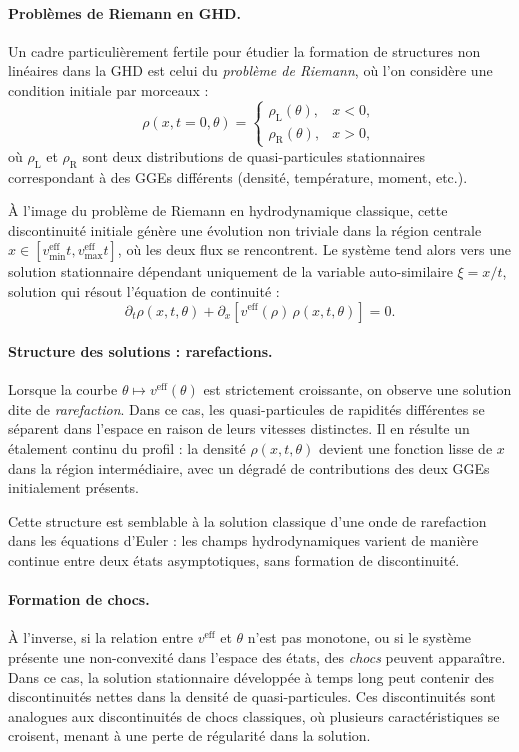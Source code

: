 \paragraph{Problèmes de Riemann en GHD.}
Un cadre particulièrement fertile pour étudier la formation de structures non linéaires dans la GHD est celui du \emph{problème de Riemann}, où l’on considère une condition initiale par morceaux :
\[
\rho(x, t = 0, \theta) =
\begin{cases}
\rho_{\mathrm{L}}(\theta), & x < 0, \\
\rho_{\mathrm{R}}(\theta), & x > 0,
\end{cases}
\]
où $\rho_{\mathrm{L}}$ et $\rho_{\mathrm{R}}$ sont deux distributions de quasi-particules stationnaires correspondant à des GGEs différents (densité, température, moment, etc.).

À l’image du problème de Riemann en hydrodynamique classique, cette discontinuité initiale génère une évolution non triviale dans la région centrale $x \in [v^{\mathrm{eff}}_{\min} t, v^{\mathrm{eff}}_{\max} t]$, où les deux flux se rencontrent. Le système tend alors vers une solution stationnaire dépendant uniquement de la variable auto-similaire $\xi = x/t$, solution qui résout l’équation de continuité :
\[
\partial_t \rho(x,t,\theta) + \partial_x \left[ v^{\mathrm{eff}}(\rho)\, \rho(x,t,\theta) \right] = 0.
\]

\paragraph{Structure des solutions : rarefactions.}
Lorsque la courbe $\theta \mapsto v^{\mathrm{eff}}(\theta)$ est strictement croissante, on observe une solution dite de \emph{rarefaction}. Dans ce cas, les quasi-particules de rapidités différentes se séparent dans l’espace en raison de leurs vitesses distinctes. Il en résulte un étalement continu du profil : la densité $\rho(x,t,\theta)$ devient une fonction lisse de $x$ dans la région intermédiaire, avec un dégradé de contributions des deux GGEs initialement présents.

Cette structure est semblable à la solution classique d’une onde de rarefaction dans les équations d’Euler : les champs hydrodynamiques varient de manière continue entre deux états asymptotiques, sans formation de discontinuité.

\paragraph{Formation de chocs.}
À l’inverse, si la relation entre $v^{\mathrm{eff}}$ et $\theta$ n’est pas monotone, ou si le système présente une non-convexité dans l’espace des états, des \emph{chocs} peuvent apparaître. Dans ce cas, la solution stationnaire développée à temps long peut contenir des discontinuités nettes dans la densité de quasi-particules. Ces discontinuités sont analogues aux discontinuités de chocs classiques, où plusieurs caractéristiques se croisent, menant à une perte de régularité dans la solution.

